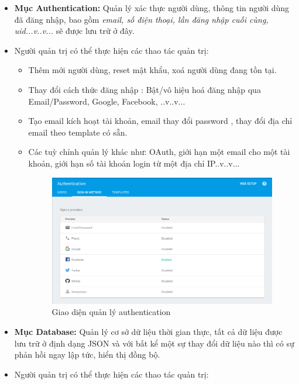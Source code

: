 \begin{itemize}
	\item \textbf{Mục Authentication: }Quản lý xác thực người dùng, thông tin người dùng đã đăng nhập, bao gồm \textit{email, số điện thoại, lần đăng nhập cuối cùng, uid...v..v...} sẽ được lưu trữ ở đây. 
	\vskip 0.1in
	\item []Người quản trị có thể thực hiện các thao tác quản trị: \begin{itemize}
	\item Thêm mới người dùng, reset mật khẩu, xoá người dùng đang tồn tại.
	\item Thay đổi cách thức đăng nhập : Bật/vô hiệu hoá đăng nhập qua Email/Password, Google, Facebook, ..v..v...
	\item Tạo email kích hoạt tài khoản, email thay đổi password , thay đổi địa chỉ email theo template có sẵn.
	\item Các tuỳ chỉnh quản lý khác như: OAuth, giới hạn một email cho một tài khoản, giới hạn số tài khoản login từ một địa chỉ IP..v..v...\\ \begin{figure}[H]
  \begin{center}
	\includegraphics[scale=0.45]{firebase_authentication}
    \caption{Giao diện quản lý authentication}
    \label{FirebaseAuthentication}
  \end{center}
\end{figure}
	\end{itemize}
	\pagebreak
	\item \textbf{Mục Database: }Quản lý cơ sở dữ liệu thời gian thực, tất cả dữ liệu được lưu trữ ở định dạng JSON và với bất kể một sự thay đổi dữ liệu nào thì có sự phản hồi ngay lập tức, hiển thị đồng bộ. 	
	\vskip 0.1in
	\item []Người quản trị có thể thực hiện các thao tác quản trị: \begin{itemize}

\end{itemize}
\end{itemize}
